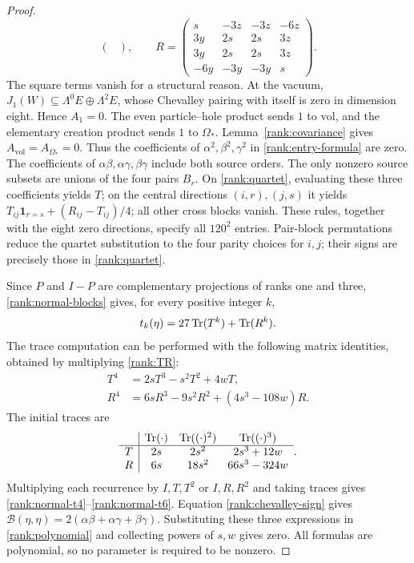 \begin{proof}
\begin{equation}
\begin{pmatrix}
 \end{pmatrix},\qquad
 R=\begin{pmatrix}
 s&-3z&-3z&-6z\\3y&2s&2s&3z\\3y&2s&2s&3z\\-6y&-3y&-3y&s
 \end{pmatrix}.
 \label{rank:TR}
\end{equation}
The square terms vanish for a structural reason. At the vacuum,
$J_1(W)\subseteq\Lambda^0E\oplus\Lambda^2E$, whose Chevalley pairing
with itself is zero in dimension eight. Hence $A_1=0$.
The even particle--hole product sends $1$ to $\mathrm{vol}$, and the
elementary creation product sends $1$ to $\Omega_*$.
Lemma~\ref{rank:covariance} gives $A_{\mathrm{vol}}=A_{\Omega_*}=0$.
Thus the coefficients of $\alpha^2,\beta^2,\gamma^2$ in
\eqref{rank:entry-formula} are zero. The coefficients of
$\alpha\beta,\alpha\gamma,\beta\gamma$ include both source orders.
The only nonzero source subsets are unions of the four pairs $B_r$.
On \eqref{rank:quartet}, evaluating these three coefficients yields $T$;
on the central directions $(i,r),(j,s)$ it yields
$T_{ij}\mathbf1_{r=s}+(R_{ij}-T_{ij})/4$; all other cross blocks vanish.
These rules, together with the eight zero directions, specify all
$120^2$ entries. Pair-block permutations reduce the quartet substitution
to the four parity choices for $i,j$; their signs are precisely those in
\eqref{rank:quartet}.

Since $P$ and $I-P$ are complementary projections of ranks one and three,
\eqref{rank:normal-blocks} gives, for every positive integer $k$,
\[
 t_k(\eta)=27\operatorname{Tr}(T^k)+\operatorname{Tr}(R^k).
\]
The trace computation can be performed with the following matrix
identities, obtained by multiplying \eqref{rank:TR}:
\begin{align*}
 T^4&=2sT^3-s^2T^2+4wT,\\
 R^4&=6sR^3-9s^2R^2+(4s^3-108w)R.
\end{align*}
The initial traces are
\[
 \begin{array}{c|ccc}
       &\operatorname{Tr}(\cdot)&\operatorname{Tr}((\cdot)^2)&\operatorname{Tr}((\cdot)^3)\\\hline
 T&2s&2s^2&2s^3+12w\\
 R&6s&18s^2&66s^3-324w
 \end{array}.
\]
Multiplying each recurrence by $I,T,T^2$ or $I,R,R^2$ and taking traces
gives \eqref{rank:normal-t4}--\eqref{rank:normal-t6}.
Equation \eqref{rank:chevalley-sign} gives
$\mathcal B(\eta,\eta)=2(\alpha\beta+\alpha\gamma+\beta\gamma)$.
Substituting these three expressions in \eqref{rank:polynomial} and
collecting powers of $s,w$ gives zero. All formulas are polynomial, so no
parameter is required to be nonzero.
\end{proof}


